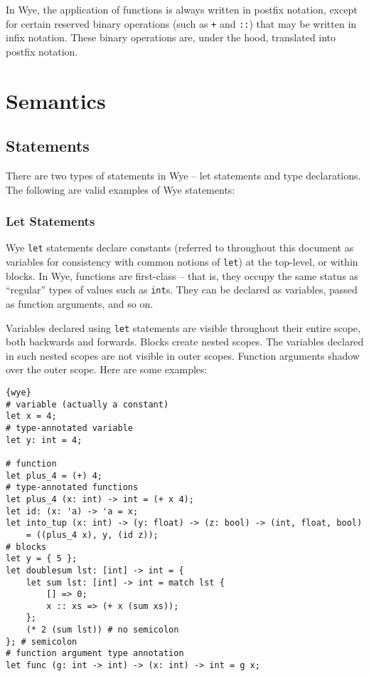 \documentclass[a4paper, 12pt]{article}
\begin{document}
In Wye, the application of functions is always written in postfix notation, except for certain reserved binary operations (such as \texttt{+} and \texttt{::}) that may be written in infix notation. These binary operations are, under the hood, translated into postfix notation.

\section{Semantics}

\subsection{Statements}
There are two types of statements in Wye -- let statements and type declarations. The following are valid examples of Wye statements:

\subsubsection{Let Statements}
Wye \texttt{let} statements declare constants (referred to throughout this document as variables for consistency with common notions of \texttt{let}) at the top-level, or within blocks. In Wye, functions are first-class -- that is, they occupy the same status as ``regular'' types of values such as \texttt{int}s. They can be declared as variables, passed as function arguments, and so on.

Variables declared using \texttt{let} statements are visible throughout their entire scope, both backwards and forwards. Blocks create nested scopes. The variables declared in such nested scopes are not visible in outer scopes. Function arguments shadow over the outer scope. Here are some examples:
\begin{lstlisting}{wye}
# variable (actually a constant)
let x = 4;
# type-annotated variable
let y: int = 4;

# function
let plus_4 = (+) 4;
# type-annotated functions
let plus_4 (x: int) -> int = (+ x 4);
let id: (x: 'a) -> 'a = x;
let into_tup (x: int) -> (y: float) -> (z: bool) -> (int, float, bool)
	= ((plus_4 x), y, (id z));
# blocks
let y = { 5 };
let doublesum lst: [int] -> int = {
	let sum lst: [int] -> int = match lst {
		[] => 0;
		x :: xs => (+ x (sum xs));
	};
	(* 2 (sum lst)) # no semicolon
}; # semicolon
# function argument type annotation
let func (g: int -> int) -> (x: int) -> int = g x;
\end{lstlisting}
\end{document}

